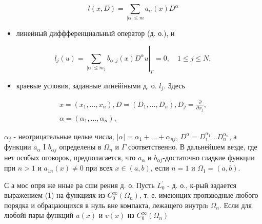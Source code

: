 \documentclass[10pt]{article}
\begin{document}
\[

l(x, D)=\sum_{|\alpha| \leqslant m} a_{\alpha}(x) D^{\alpha}

\]



\begin{itemize}

  \item линеӥный диффференциальный оператор (д. о.), и

\end{itemize}



\[

l_{j}(u)=\left.\sum_{|\alpha| \leqslant m_{1}} b_{\alpha, j}(x) D^{\alpha} u\right|_{\Gamma}=0, \quad 1 \leqslant j \leqslant N,

\]



\begin{itemize}

  \item краевые условия, заданные линейіными д. о. $l_{j}$. Здесь

\end{itemize}



\[

\begin{gathered}

x=\left(x_{1}, \ldots, x_{n}\right), D=\left(D_{1}, \ldots, D_{n}\right), D_{j}=\frac{\partial}{\partial x_{j}}, \\

\alpha=\left(\alpha_{1}, \ldots, \alpha_{n}\right),

\end{gathered}

\]



$\alpha_{j}$ - неотрицательные целые числа, $|\alpha|=\alpha_{1}+\ldots+\alpha_{n j}$, $D^{\alpha}=D_{1}^{\alpha_{1}} \ldots D_{n}^{\alpha_{n}}$, а функции $a_{\alpha}$ І $b_{\alpha j}$ определены в $\Omega_{n}$ и $\Gamma$ соответственно. В дальнейшем везде, где нет особых оговорок, предполагается, что $a_{\alpha}$ и $b_{\alpha j}$-достаточно гладкие функции при $n>1$ и $a_{1 n}(x) \neq 0$ при всех $x \in(a, b)$, если $n=1$ и $\Omega_{1}=(a, b)$.



С а мос опря же нные ра сши рения д. о. Пусть $L_{0}^{\prime}$ - д. о., к-рый задается выражением (1) на функциях из $C_{0}^{\infty}\left(\Omega_{n}\right)$, т. е. имеюнцих пропзводные любого порядка и обрацающихся в нуль вне компакта, лежащего внутрлı $\Omega_{n}$. Если для любойі пары функций $u(x)$ и $v(x)$ из $C_{0}^{\infty}\left(\Omega_{n}\right)$
\end{document}
